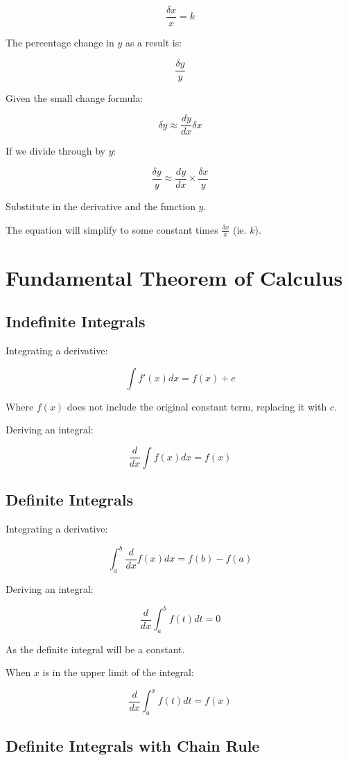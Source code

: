 \documentclass[a4paper,11pt]{article}
\begin{document}
$$
\frac{\delta x}{x} = k
$$

The percentage change in $y$ as a result is:

$$
\frac{\delta y}{y}
$$

Given the small change formula:

$$
\delta y \approx \frac{dy}{dx} \delta x
$$

If we divide through by $y$:

$$
\frac{\delta y}{y} \approx \frac{dy}{dx} \times \frac{\delta x}{y}
$$

Substitute in the derivative and the function $y$.

The equation will simplify to some constant times $\frac{\delta x}{x}$
(ie. $k$).



\section{Fundamental Theorem of Calculus}

\subsection{Indefinite Integrals}

Integrating a derivative:

$$
\int f'(x) dx = f(x) + c
$$

Where $f(x)$ does not include the original constant term, replacing it with $c$.

Deriving an integral:

$$
\frac{d}{dx} \int f(x) dx = f(x)
$$


\subsection{Definite Integrals}

Integrating a derivative:

$$
\int_a^b \frac{d}{dx} f(x) dx = f(b) - f(a)
$$

Deriving an integral:

$$
\frac{d}{dx} \int_a^b f(t) dt = 0
$$

As the definite integral will be a constant.

When $x$ is in the upper limit of the integral:

$$
\frac{d}{dx} \int_a^x f(t) dt = f(x)
$$


\subsection{Definite Integrals with Chain Rule}
\end{document}
